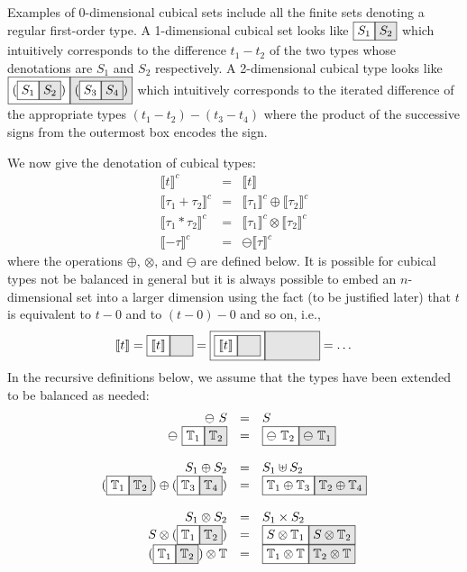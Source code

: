 \documentclass[authoryear,preprint]{sigplanconf}
\newcommand{\cubt}{\mathbb{T}}
\newcommand{\den}[1]{\llbracket #1 \rrbracket}
\newcommand{\denc}[1]{\llbracket #1 \rrbracket^c}
\newcommand{\nodet}[2]{\fcolorbox{black}{white}{$#1$}\fcolorbox{black}{gray!20}{$#2$}}
\begin{document}
Examples of 0-dimensional cubical sets include all the finite sets denoting a
regular first-order type. A 1-dimensional cubical set looks like
$\nodet{S_1}{S_2}$ which intuitively corresponds to the difference $t_1 -
t_2$ of the two types whose denotations are $S_1$ and $S_2$ respectively. A
2-dimensional cubical type looks like
$\nodet{(\nodet{S_1}{S_2})}{(\nodet{S_3}{S_4})}$ which intuitively
corresponds to the iterated difference of the appropriate types
$(t_1-t_2)-(t_3-t_4)$ where the product of the successive signs from the
outermost box encodes the sign.

We now give the denotation of cubical types:
\[\begin{array}{rcl}
\denc{t} &=& \den{t} \\
\denc{\tau_1 + \tau_2} &=& \denc{\tau_1} \oplus \denc{\tau_2} \\
\denc{\tau_1 * \tau_2} &=& \denc{\tau_1} \otimes \denc{\tau_2} \\
\denc{- \tau} &=& \ominus \denc{\tau}
\end{array}\]
where the operations $\oplus$, $\otimes$, and $\ominus$ are defined below.
It is possible for cubical types not be balanced in general but it is always
possible to embed an $n$-dimensional set into a larger dimension using the
fact (to be justified later) that $t$ is equivalent to $t-0$ and to $(t-0)-0$
and so on, i.e.,
\[
\den{t} = \nodet{\den{t}}{\phantom{\den{t}}} = 
  \nodet{\nodet{\den{t}}{\phantom{\den{t}}}}
        {\phantom{{\nodet{\den{t}}{\phantom{\den{t}}}}}} = \ldots \\
\]
In the recursive definitions below, we assume that the types have been
extended to be balanced as needed:
\[\begin{array}{rcl}
\ominus~S &=& S \\
\ominus~\nodet{\cubt_1}{\cubt_2} &=& \nodet{\ominus~\cubt_2}{\ominus~\cubt_1} \\
\\
S_1 \oplus S_2 &=& S_1 \uplus S_2 \\
(\nodet{\cubt_1}{\cubt_2}) \oplus (\nodet{\cubt_3}{\cubt_4}) &=& 
  \nodet{\cubt_1 \oplus \cubt_3}{\cubt_2 \oplus \cubt_4} \\
\\
S_1 \otimes S_2 &=& S_1 \times S_2 \\
S \otimes (\nodet{\cubt_1}{\cubt_2}) &=& 
  \nodet{S \otimes \cubt_1}{S \otimes \cubt_2} \\
(\nodet{\cubt_1}{\cubt_2}) \otimes \cubt &=& 
  \nodet{\cubt_1 \otimes \cubt}{\cubt_2 \otimes \cubt}
\end{array}\]
\end{document}
